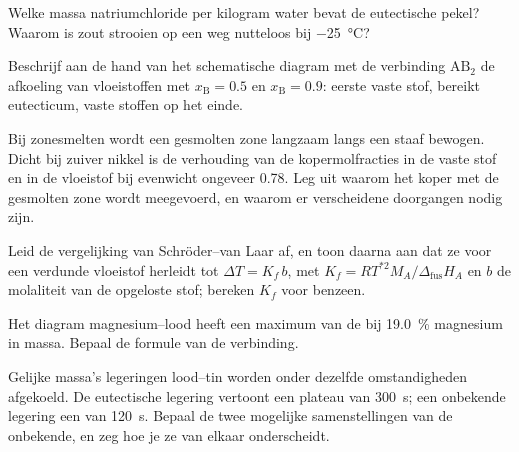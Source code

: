 \begin{exercise}[$\star\star$]\label{exo:b2:solid-liquid-diagrams:7}
Welke massa natriumchloride per kilogram water bevat de eutectische pekel?
Waarom is zout strooien op een weg nutteloos bij \qty{-25}{\degreeCelsius}?
\end{exercise}

\begin{exercise}[$\star\star$]\label{exo:b2:solid-liquid-diagrams:8}
Beschrijf aan de hand van het schematische diagram met de verbinding $\mathrm{AB_2}$ de
afkoeling van vloeistoffen met $x_{\mathrm B} = 0.5$ en $x_{\mathrm B} = 0.9$: eerste
vaste stof, bereikt eutecticum, vaste stoffen op het einde.
\end{exercise}

\begin{exercise}[$\star\star$]\label{exo:b2:solid-liquid-diagrams:9}
Bij zonesmelten wordt een gesmolten zone langzaam langs een staaf bewogen. Dicht bij zuiver nikkel
is de verhouding van de kopermolfracties in de vaste stof en in de vloeistof bij
evenwicht ongeveer 0.78. Leg uit waarom het koper met de gesmolten zone wordt
meegevoerd, en waarom er verscheidene doorgangen nodig zijn.
\end{exercise}

\begin{exercise}[$\star\star\star$]\label{exo:b2:solid-liquid-diagrams:10}
Leid de vergelijking van Schröder--van Laar af, en toon daarna aan dat ze voor een verdunde vloeistof
herleidt tot $\Delta T = K_f\,b$, met $K_f = RT^{*2}M_A/\Delta_{\text{fus}}H_A$
en $b$ de molaliteit van de opgeloste stof; bereken $K_f$ voor benzeen.
\end{exercise}

\begin{exercise}[$\star\star\star$]\label{exo:b2:solid-liquid-diagrams:11}
Het diagram magnesium--lood heeft een maximum van de  bij 19.0~\% magnesium in
massa. Bepaal de formule van de verbinding.
\end{exercise}

\begin{exercise}[$\star\star\star$]\label{exo:b2:solid-liquid-diagrams:12}
Gelijke massa's legeringen lood--tin worden onder dezelfde omstandigheden afgekoeld. De
eutectische legering vertoont een plateau van \qty{300}{s}; een onbekende legering een van
\qty{120}{s}. Bepaal de twee mogelijke samenstellingen van de onbekende, en zeg hoe je
ze van elkaar onderscheidt.
\end{exercise}

